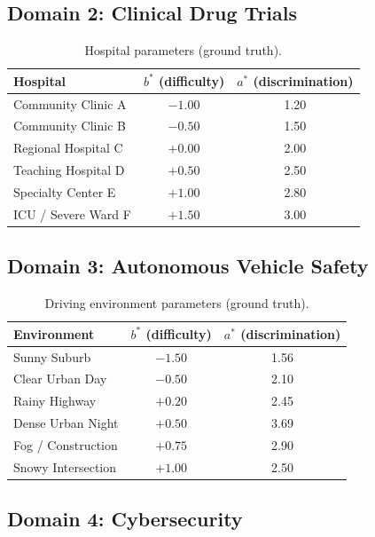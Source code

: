 \documentclass[11pt,a4paper]{article}
\begin{document}
\subsection{Domain 2: Clinical Drug Trials}

\begin{table}[h]
\centering
\caption{Hospital parameters (ground truth).}
\small
\begin{tabular}{lcc}
\toprule
Hospital & $b^*$ (difficulty) & $a^*$ (discrimination) \\
\midrule
Community Clinic A & $-1.00$ & 1.20 \\
Community Clinic B & $-0.50$ & 1.50 \\
Regional Hospital C & $+0.00$ & 2.00 \\
Teaching Hospital D & $+0.50$ & 2.50 \\
Specialty Center E & $+1.00$ & 2.80 \\
ICU / Severe Ward F & $+1.50$ & 3.00 \\
\bottomrule
\end{tabular}
\end{table}

\subsection{Domain 3: Autonomous Vehicle Safety}

\begin{table}[h]
\centering
\caption{Driving environment parameters (ground truth).}
\small
\begin{tabular}{lcc}
\toprule
Environment & $b^*$ (difficulty) & $a^*$ (discrimination) \\
\midrule
Sunny Suburb & $-1.50$ & 1.56 \\
Clear Urban Day & $-0.50$ & 2.10 \\
Rainy Highway & $+0.20$ & 2.45 \\
Dense Urban Night & $+0.50$ & 3.69 \\
Fog / Construction & $+0.75$ & 2.90 \\
Snowy Intersection & $+1.00$ & 2.50 \\
\bottomrule
\end{tabular}
\end{table}

\subsection{Domain 4: Cybersecurity}
\end{document}
